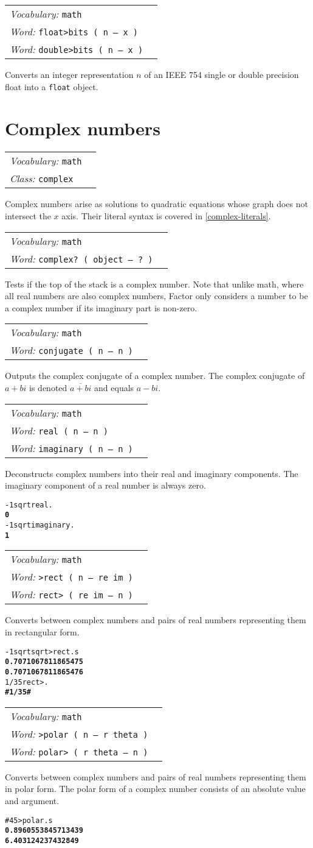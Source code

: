 \documentclass{book}
\newcommand{\tto}{\symbol{123}}
\newcommand{\ttc}{\symbol{125}}
\newcommand{\vocabulary}[1]{\emph{Vocabulary:} \texttt{#1}&\\}
\newcommand{\ordinaryword}[2]{\index{\texttt{#1}}\emph{Word:} \texttt{#2}&\\}
\newcommand{\classword}[1]{\index{\texttt{#1}}\emph{Class:} \texttt{#1}&\\}
\newcommand{\predword}[1]{\ordinaryword{#1}{#1~( object -- ?~)}}
\newcommand{\wordtable}[1]{


\begin{tabularx}{12cm}{lX}
\hline
#1
\hline
\end{tabularx}

}
\begin{document}
\wordtable{
\vocabulary{math}
\ordinaryword{bits>float}{float>bits ( n -- x )}
\ordinaryword{bits>double}{double>bits ( n -- x )}
}
Converts an integer representation $n$ of an IEEE 754 single or double precision float into a \verb|float| object.

\section{Complex numbers}\label{complex-numbers}

\wordtable{
\vocabulary{math}
\classword{complex}
}
Complex numbers arise as solutions to quadratic equations whose graph does not intersect the $x$ axis. Their literal syntax is covered in \ref{complex-literals}.

\wordtable{
\vocabulary{math}
\predword{complex?}
}
Tests if the top of the stack is a complex number. Note that unlike math, where all real numbers are also complex numbers, Factor only considers a number to be a complex number if its imaginary part is non-zero.

\wordtable{
\vocabulary{math}
\ordinaryword{conjugate}{conjugate ( n -- n )}
}
Outputs the complex conjugate of a complex number. The complex conjugate of $a+bi$ is denoted $\overline{a+bi}$ and equals $a-bi$.

\wordtable{
\vocabulary{math}
\ordinaryword{real}{real ( n -- n )}
\ordinaryword{imaginary}{imaginary ( n -- n )}
}
Deconstructs complex numbers into their real and imaginary components. The imaginary component of a real number is always zero.
\begin{alltt}
  -1 sqrt real .
\textbf{0}
  -1 sqrt imaginary .
\textbf{1}
\end{alltt}
\wordtable{
\vocabulary{math}
\ordinaryword{>rect}{>rect ( n -- re im )}
\ordinaryword{rect>}{rect> ( re im -- n )}
}
Converts between complex numbers and pairs of real numbers representing them in rectangular form.
\begin{alltt}
  -1 sqrt sqrt >rect .s
\textbf{0.7071067811865475
0.7071067811865476}
  1/3 5 rect> .
\textbf{\#\tto 1/3 5 \ttc\#}
\end{alltt}

\wordtable{
\vocabulary{math}
\ordinaryword{>polar}{>polar ( n -- r theta )}
\ordinaryword{polar>}{polar> ( r theta -- n )}
}
Converts between complex numbers and pairs of real numbers representing them in polar form. The polar form of a complex number consists of an absolute value and argument.
\begin{alltt}
  \#\tto 4 5 \ttc >polar .s
\textbf{0.8960553845713439
6.403124237432849}
\end{alltt}
\end{document}
